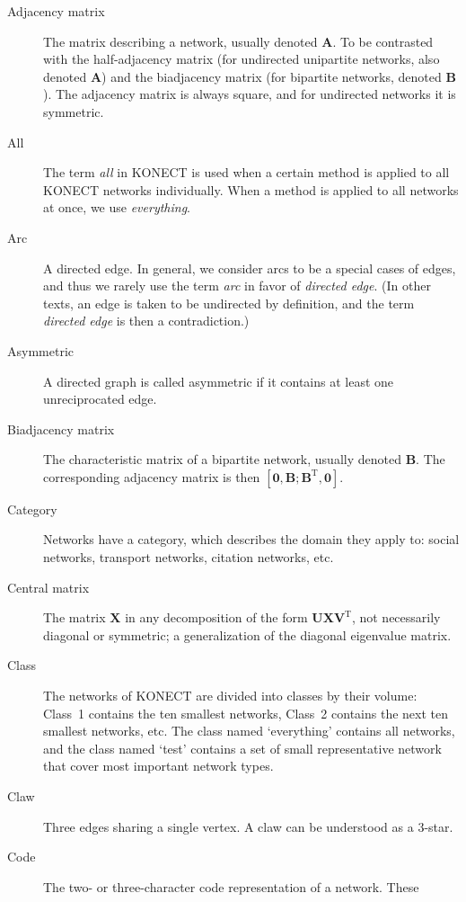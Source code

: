 \documentclass{article}
\begin{document}
\begin{description}
  \item[Adjacency matrix]
    The matrix describing a network, usually denoted $\mathbf A$.  To be
    contrasted with the 
    half-adjacency matrix (for undirected unipartite networks, also
    denoted $\mathbf A$) and the
    biadjacency matrix (for bipartite networks, denoted $\mathbf B$). 
    The adjacency matrix is always square, and for undirected networks
    it is symmetric. 
  \item[All] The term \emph{all} in KONECT is used when a certain method
    is applied to all KONECT networks individually.  When a method is
    applied to all networks at once, we use \emph{everything}. 
  \item[Arc] A directed edge.  In general, we consider arcs to be a
    special cases of edges, and thus we rarely use the term \emph{arc}
    in favor of \emph{directed edge}.  (In other texts, an edge is taken
    to be undirected by definition, and the term \emph{directed edge} is
    then a contradiction.)
  \item[Asymmetric] A directed graph is called asymmetric if it contains
    at least one unreciprocated edge. 
  \item[Biadjacency matrix]
    The characteristic matrix of a bipartite network, usually denoted
    $\mathbf B$.  The corresponding adjacency matrix is then $[\mathbf
      0, \mathbf B; \mathbf B^{\mathrm T}, \mathbf 0]$. 
  \item[Category] Networks have a category, which describes the domain
    they apply to:  social networks, transport networks, citation
    networks, etc. 
  \item[Central matrix] The matrix $\mathbf X$ in any decomposition
    of the form $\mathbf U \mathbf X \mathbf V^{\mathrm T}$, not necessarily
    diagonal or symmetric; a generalization of the diagonal eigenvalue
    matrix.
  \item[Class]
    The networks of KONECT are divided into classes by their volume:
    Class~1 contains the ten smallest networks, Class~2 contains the
    next ten smallest networks, etc.  The class named `everything' contains all
    networks, and the class named `test' contains a set of small
    representative network that cover most important network types. 
  \item[Claw]
    Three edges sharing a single vertex.  A claw can be understood as a 3-star. 
  \item[Code]
    The two- or three-character code representation of a network.  These

\end{description}
\end{document}

